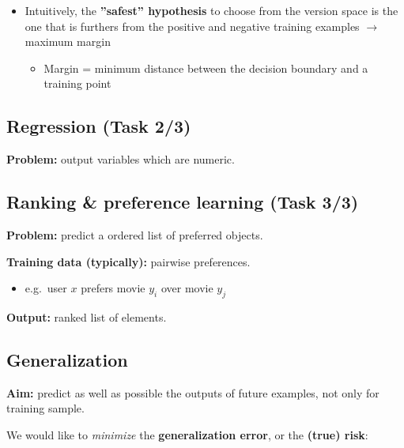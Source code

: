 \documentclass[12pt, a4paper]{article}
\begin{document}
\begin{itemize}
\itemsep1pt\parskip0pt
\item
  Intuitively, the \textbf{''safest'' hypothesis} to choose from the
  version space is the one that is furthers from the positive and
  negative training examples $\rightarrow$ maximum margin

  \begin{itemize}
  \itemsep1pt\parskip0pt
  \item
    Margin = minimum distance between the decision boundary and a
    training point
  \end{itemize}
\end{itemize}






\subsection{Regression (Task 2/3) }\label{regression}

\textbf{Problem:} output variables which are numeric.





\subsection{Ranking \& preference learning (Task 3/3)
}\label{ranking-preference-learning}

\textbf{Problem:} predict a ordered list of preferred objects.

\textbf{Training data (typically):} pairwise preferences.

\begin{itemize}
  \item e.g.~user $x$ prefers movie $y_i$ over movie $y_j$
\end{itemize}

\textbf{Output:} ranked list of elements.




\subsection{Generalization}\label{generalization}

\textbf{Aim:} predict as well as possible the outputs of future
examples, not only for training sample.

We would like to \emph{minimize} the \textbf{generalization error}, or
the \textbf{(true) risk}:
\end{document}
